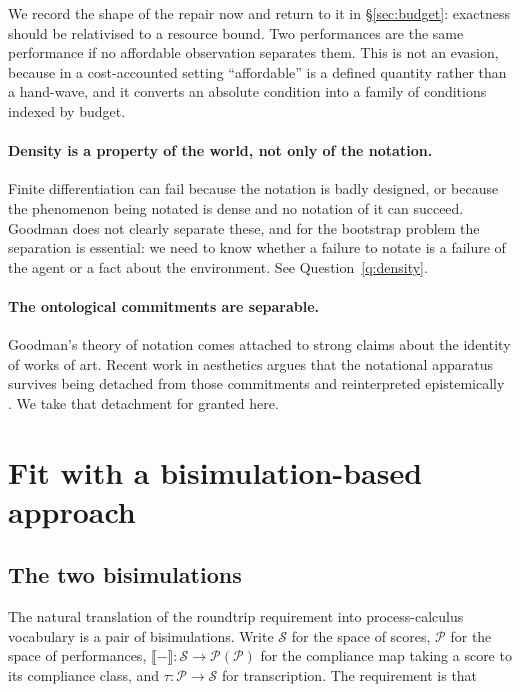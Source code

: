 \documentclass[11pt,a4paper]{article}
\theoremstyle{definition}
\theoremstyle{plain}
\theoremstyle{remark}
\begin{document}
We record the shape of the repair now and return to it in \S\ref{sec:budget}: exactness
should be relativised to a resource bound. Two performances are the same performance if no
affordable observation separates them. This is not an evasion, because in a cost-accounted
setting ``affordable'' is a defined quantity rather than a hand-wave, and it converts an
absolute condition into a family of conditions indexed by budget.

\paragraph{Density is a property of the world, not only of the notation.} Finite
differentiation can fail because the notation is badly designed, or because the phenomenon
being notated is dense and no notation of it can succeed. Goodman does not clearly
separate these, and for the bootstrap problem the separation is essential: we need to know
whether a failure to notate is a failure of the agent or a fact about the environment. See
Question~\ref{q:density}.

\paragraph{The ontological commitments are separable.} Goodman's theory of notation comes
attached to strong claims about the identity of works of art. Recent work in aesthetics
argues that the notational apparatus survives being detached from those commitments and
reinterpreted epistemically \cite{estetika2026}. We take that detachment for granted here.

\section{Fit with a bisimulation-based approach}
\label{sec:bisim}

\subsection{The two bisimulations}

The natural translation of the roundtrip requirement into process-calculus vocabulary is a
pair of bisimulations. Write $\mathcal{S}$ for the space of scores, $\mathcal{P}$ for the
space of performances, $\llbracket-\rrbracket : \mathcal{S} \to \mathcal{P}(\mathcal{P})$
for the compliance map taking a score to its compliance class, and
$\tau : \mathcal{P} \to \mathcal{S}$ for transcription. The requirement is that
\end{document}
